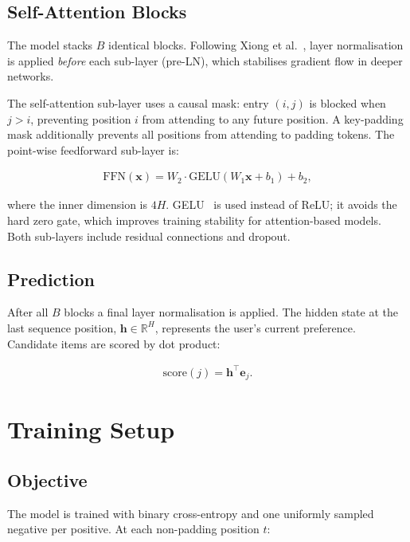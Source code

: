 \documentclass[sigconf]{acmart}
\begin{document}
\subsection{Self-Attention Blocks}

The model stacks $B$ identical blocks. Following Xiong et al.~\cite{xiong2020layer},
layer normalisation is applied \emph{before} each sub-layer (pre-LN), which
stabilises gradient flow in deeper networks.

The self-attention sub-layer uses a causal mask: entry $(i,j)$ is blocked when
$j > i$, preventing position $i$ from attending to any future position. A
key-padding mask additionally prevents all positions from attending to padding
tokens. The point-wise feedforward sub-layer is:

\begin{align}
  \text{FFN}(\mathbf{x}) = W_2 \cdot \text{GELU}(W_1 \mathbf{x} + b_1) + b_2,
\end{align}

where the inner dimension is $4H$. GELU~\cite{hendrycks2016gaussian} is used
instead of ReLU; it avoids the hard zero gate, which improves training stability
for attention-based models. Both sub-layers include residual connections and
dropout.

\subsection{Prediction}

After all $B$ blocks a final layer normalisation is applied. The hidden state
at the last sequence position, $\mathbf{h} \in \mathbb{R}^H$, represents the
user's current preference. Candidate items are scored by dot product:

\begin{align}
  \text{score}(j) = \mathbf{h}^\top \mathbf{e}_j.
\end{align}


\section{Training Setup}

\subsection{Objective}

The model is trained with binary cross-entropy and one uniformly sampled
negative per positive. At each non-padding position $t$:
\end{document}
